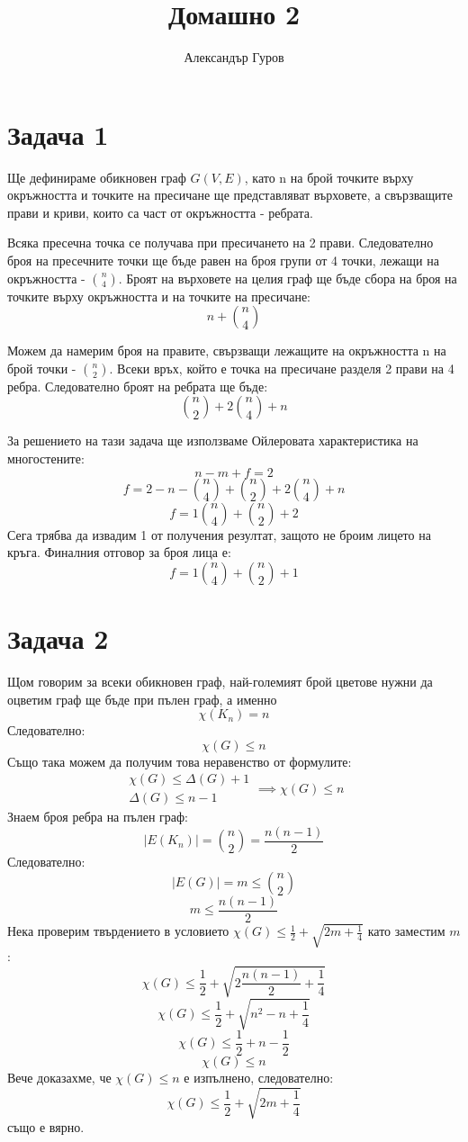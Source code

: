 \documentclass{article}
\title{Домашно 2}
\author{Александър Гуров}
\date{\datebulgarian{\today}}
\begin{document}
\maketitle
\section*{Задача 1}

Ще дефинираме обикновен граф $G(V,E)$, като n на брой точките върху окръжността и точките
на пресичане ще представляват върховете, а свързващите прави и криви,
които са част от окръжността - ребрата.



Всяка пресечна точка се получава при пресичането на 2 прави. Следователно броя на пресечните точки
ще бъде равен на броя групи от 4 точки, лежащи на окръжността - $\binom{n}{4}$.
Броят на върховете на целия граф ще бъде сбора на броя на точките върху окръжността и на точките
на пресичане:
\[
    n+\binom{n}{4}
\]

Можем да намерим броя на правите, свързващи лежащите на окръжността n на брой точки - $\binom{n}{2}$.
Всеки връх, който е точка на пресичане разделя 2 прави на 4 ребра. Следователно броят
на ребрата ще бъде:
\[
    \binom{n}{2}+2\binom{n}{4}+n
\]

За решението на тази задача ще използваме Ойлеровата характеристика на многостените:
\[
    n-m+f=2
\]
\[
    f=2-n-\binom{n}{4}+\binom{n}{2}+2\binom{n}{4}+n
\]
\[
    f=1\binom{n}{4}+\binom{n}{2}+2
\]
Сега трябва да извадим 1 от получения резултат, защото не броим лицето на кръга.
Финалния отговор за броя лица е:
\[
    f=1\binom{n}{4}+\binom{n}{2}+1
\]

\section*{Задача 2}
Щом говорим за всеки обикновен граф, най-големият брой цветове нужни да оцветим граф ще бъде при пълен граф, а именно
\[
    \chi(K_n)=n
\]
Следователно:
\[
    \chi(G)\leq n
\]
Също така можем да получим това неравенство от формулите:
\[
    \begin{array}{c}
        \chi (G) \leq \Delta (G)+1 \\
        \Delta(G) \leq n-1
    \end{array}
    \implies
    \chi(G)\leq n
\]
Знаем броя ребра на пълен граф:
\[
    |E(K_n)|=\binom{n}{2}=\frac{n(n-1)}{2}
\]
Следователно:
\[
    |E(G)|=m\leq \binom{n}{2}
\]
\[
    m\leq \frac{n(n-1)}{2}
\]
Нека проверим твърдението в условието $\chi (G)\leq \frac{1}{2} + \sqrt{2m+\frac{1}{4}}$ като заместим $m$:
\[
    \chi (G)\leq \frac{1}{2} + \sqrt{2\frac{n(n-1)}{2}+\frac{1}{4}}
\]
\[
    \chi (G)\leq \frac{1}{2} + \sqrt{n^2-n+\frac{1}{4}}
\]
\[
    \chi (G)\leq \frac{1}{2} + n-\frac{1}{2}
\]
\[
    \chi (G)\leq n
\]
Вече доказахме, че $\chi (G)\leq n$ е изпълнено, следователно:
\[
    \chi (G)\leq \frac{1}{2} + \sqrt{2m+\frac{1}{4}}
\]
също е вярно.
\end{document}
